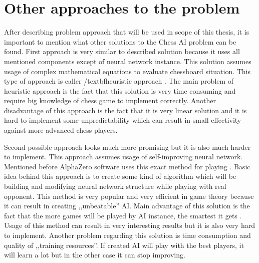     \section{Other approaches to the problem}
    After describing problem approach that will be used in scope of this thesis, it is important to mention what other solutions to the Chess AI problem can be found. First approach is very similar to described solution because it uses all mentioned components except of neural network instance. This solution assumes usage of complex mathematical equations to evaluate chessboard situation. This type of approach is caller /textbf{heuristic approach} \cite{bib:article-computer-chess-move-ordering,bib:internet-step-by-step-chess-ai}. The main problem of heuristic approach is the fact that this solution is very time consuming and require big knowledge of chess game to implement correctly. Another disadvantage of this approach is the fact that it is very linear solution and it is hard to implement some unpredictability which can result in small effectivity against more advanced chess players.

    Second possible approach looks much more promising but it is also much harder to implement. This approach assumes usage of self-improving neural network. Mentioned before AlphaZero software uses this exact method for playing \cite{bib:internet-alphazero}. Basic idea behind this approach is to create some kind of algorithm which will be building and modifying neural network structure while playing with real opponent. This method is very popular and very efficient in game theory because it can result in creating ,,unbeatable'' AI. Main advantage of this solution is the fact that the more games will be played by AI instance, the smartest it gets \cite{bib:article-self-improving-nn}. Usage of this method can result in very interesting results but it is also very hard to implement. Another problem regarding this solution is time consumption and quality of ,,training resources''. If created AI will play with the best players, it will learn a lot but in the other case it can stop improving.



